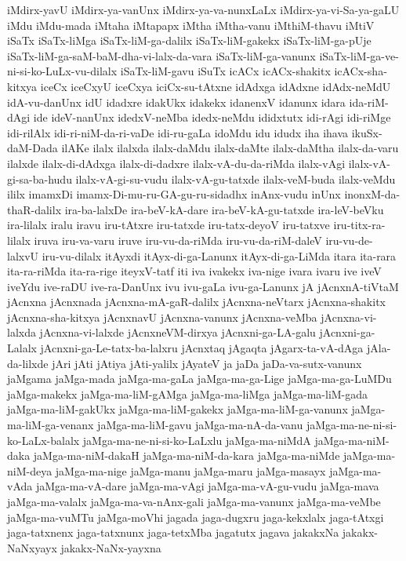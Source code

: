 {iMdirx-yavU
iMdirx-ya-vanUnx
iMdirx-ya-va-nunxLaLx
iMdirx-ya-vi-Sa-ya-gaLU
iMdu
iMdu-mada
iMtaha
iMtapapx
iMtha
iMtha-vanu
iMthiM-thavu
iMtiV
iSaTx
iSaTx-liMga
iSaTx-liM-ga-dalilx
iSaTx-liM-gakekx
iSaTx-liM-ga-pUje
iSaTx-liM-ga-saM-baM-dha-vi-lalx-da-vara
iSaTx-liM-ga-vanunx
iSaTx-liM-ga-ve-ni-si-ko-LuLx-vu-dilalx
iSaTx-liM-gavu
iSuTx
icACx
icACx-shakitx
icACx-sha-kitxya
iceCx
iceCxyU
iceCxya
iciCx-su-tAtxne
idAdxga
idAdxne
idAdx-neMdU
idA-vu-danUnx
idU
idadxre
idakUkx
idakekx
idanenxV
idanunx
idara
ida-riM-dAgi
ide
ideV-nanUnx
idedxV-neMba
idedx-neMdu
ididxtutx
idi-rAgi
idi-riMge
idi-rilAlx
idi-ri-niM-da-ri-vaDe
idi-ru-gaLa
idoMdu
idu
idudx
iha
ihava
ikuSx-daM-Dada
ilAKe
ilalx
ilalxda
ilalx-daMdu
ilalx-daMte
ilalx-daMtha
ilalx-da-varu
ilalxde
ilalx-di-dAdxga
ilalx-di-dadxre
ilalx-vA-du-da-riMda
ilalx-vAgi
ilalx-vA-gi-sa-ba-hudu
ilalx-vA-gi-su-vudu
ilalx-vA-gu-tatxde
ilalx-veM-buda
ilalx-veMdu
ililx
imamxDi
imamx-Di-mu-ru-GA-gu-ru-sidadhx
inAnx-vudu
inUnx
inonxM-da-thaR-dalilx
ira-ba-lalxDe
ira-beV-kA-dare
ira-beV-kA-gu-tatxde
ira-leV-beVku
ira-lilalx
iralu
iravu
iru-tAtxre
iru-tatxde
iru-tatx-deyoV
iru-tatxve
iru-titx-ra-lilalx
iruva
iru-va-varu
iruve
iru-vu-da-riMda
iru-vu-da-riM-daleV
iru-vu-de-lalxvU
iru-vu-dilalx
itAyxdi
itAyx-di-ga-Lanunx
itAyx-di-ga-LiMda
itara
ita-rara
ita-ra-riMda
ita-ra-rige
iteyxV-tatf
iti
iva
ivakekx
iva-nige
ivara
ivaru
ive
iveV
iveYdu
ive-raDU
ive-ra-DanUnx
ivu
ivu-gaLa
ivu-ga-Lanunx
jA
jAcnxnA-tiVtaM
jAcnxna
jAcnxnada
jAcnxna-mA-gaR-dalilx
jAcnxna-neVtarx
jAcnxna-shakitx
jAcnxna-sha-kitxya
jAcnxnavU
jAcnxna-vanunx
jAcnxna-veMba
jAcnxna-vi-lalxda
jAcnxna-vi-lalxde
jAcnxneVM-dirxya
jAcnxni-ga-LA-galu
jAcnxni-ga-Lalalx
jAcnxni-ga-Le-tatx-ba-lalxru
jAcnxtaq
jAgaqta
jAgarx-ta-vA-dAga
jAla-da-lilxde
jAri
jAti
jAtiya
jAti-yalilx
jAyateV
ja
jaDa
jaDa-va-sutx-vanunx
jaMgama
jaMga-mada
jaMga-ma-gaLa
jaMga-ma-ga-Lige
jaMga-ma-ga-LuMDu
jaMga-makekx
jaMga-ma-liM-gAMga
jaMga-ma-liMga
jaMga-ma-liM-gada
jaMga-ma-liM-gakUkx
jaMga-ma-liM-gakekx
jaMga-ma-liM-ga-vanunx
jaMga-ma-liM-ga-venanx
jaMga-ma-liM-gavu
jaMga-ma-nA-da-vanu
jaMga-ma-ne-ni-si-ko-LaLx-balalx
jaMga-ma-ne-ni-si-ko-LaLxlu
jaMga-ma-niMdA
jaMga-ma-niM-daka
jaMga-ma-niM-dakaH
jaMga-ma-niM-da-kara
jaMga-ma-niMde
jaMga-ma-niM-deya
jaMga-ma-nige
jaMga-manu
jaMga-maru
jaMga-masayx
jaMga-ma-vAda
jaMga-ma-vA-dare
jaMga-ma-vAgi
jaMga-ma-vA-gu-vudu
jaMga-mava
jaMga-ma-valalx
jaMga-ma-va-nAnx-gali
jaMga-ma-vanunx
jaMga-ma-veMbe
jaMga-ma-vuMTu
jaMga-moVhi
jagada
jaga-dugxru
jaga-kekxlalx
jaga-tAtxgi
jaga-tatxnenx
jaga-tatxnunx
jaga-tetxMba
jagatutx
jagava
jakakxNa
jakakx-NaNxyayx
jakakx-NaNx-yayxna
}
